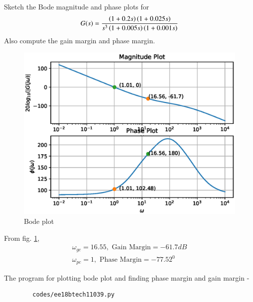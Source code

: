     
    \item Sketch the Bode magnitude and phase plots for 
    \begin{align}
        G(s) = \frac{\left(1+0.2s\right)\left(1+0.025s\right)}{s^3\left(1+0.005s\right)\left(1+0.001s\right)}
    \end{align}
    Also compute the gain margin and phase margin.\\
    \solution
    
    \begin{figure}[!h]
    \centering
      \includegraphics[width=\columnwidth]{./figs/ee18btech11039/ee18btech11039.eps}
      \caption{Bode plot}
      \label{fig:ee18btech11039}
    \end{figure}
    
    From fig. \ref{fig:ee18btech11039},
    \begin{align}
        \omega_{gc} = 16.55, \text{ Gain Margin} = -61.7 dB \\
        \omega_{pc} = 1, \text{ Phase Margin} = -77.52^0
    \end{align}
    
    The program for plotting bode plot and finding phase margin and gain margin -
    \begin{lstlisting}
        codes/ee18btech11039.py
    \end{lstlisting}
    
    
    
